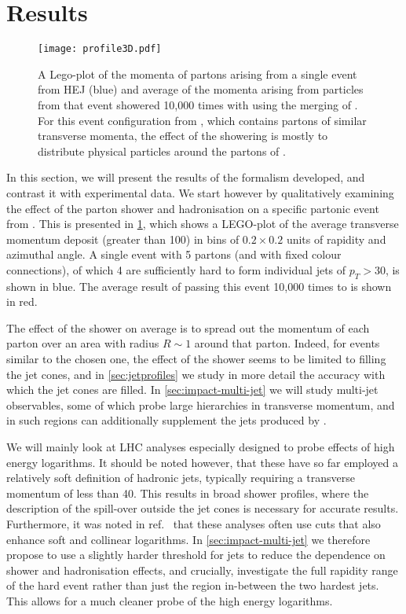 \section{Results}
\label{sec:results}
\label{sec:descr-jet-struct}

\begin{figure}[t]
  \centering
   \texttt{[image: profile3D.pdf]}
  \caption{A Lego-plot of the momenta of partons arising from a single event
    from HEJ (blue) and average of the momenta arising from particles from
    that event showered 10,000 times with \py using the merging of
    \HEJpy. For this event configuration from \HEJ, which contains partons of
    similar transverse momenta, the effect of the showering is mostly to
    distribute physical particles around the partons of \HEJ.}
  \label{fig:lego}
\end{figure}

In this section, we will present the results of the formalism developed, and
contrast it with experimental data. We start however by qualitatively examining the
effect of the parton shower and hadronisation on a specific partonic event from \HEJ.
This is presented in \cref{fig:lego}, which shows a LEGO-plot of the average transverse momentum
deposit (greater than 100\MeV) in bins of $0.2\times 0.2$ units of rapidity and azimuthal angle. 
A single \HEJ event with 5 partons (and with fixed colour connections),
of which 4 are sufficiently hard to form individual jets of
$p_T>30$\GeV, is shown in blue. The average result of passing this event 10,000 times to \py
is shown in red. 

The effect of the shower on average is to spread out
the momentum of each \HEJ parton over an area with radius
$R\sim 1$ around that parton.
Indeed, for events similar to the chosen one, the effect of
the shower seems to be limited to filling the jet cones, and in \cref{sec:jetprofiles}
we study in more detail the accuracy with which the jet
cones are filled. In \cref{sec:impact-multi-jet} we will study
multi-jet observables, some of which probe large hierarchies in transverse momentum, and in such regions 
\py can additionally supplement the jets produced by \HEJ. 

We will mainly look at LHC analyses especially designed to probe
effects of high energy logarithms. It should be noted however, that
these have so far employed a relatively soft definition of
hadronic jets, typically requiring a transverse momentum of less than
40\GeV. This results in broad shower profiles, where the description
of the spill-over outside the jet cones is necessary for accurate
results. Furthermore, it was noted in ref.~\cite{Alioli:2012tp} that
these analyses often use cuts that also enhance soft and collinear
logarithms. In \cref{sec:impact-multi-jet} we therefore
propose to use a slightly harder threshold for jets to reduce the dependence
on shower and hadronisation effects, and crucially, investigate the full
rapidity range of the hard event rather than just the region in-between the
two hardest jets. This allows for a much
cleaner probe of the high energy logarithms.

